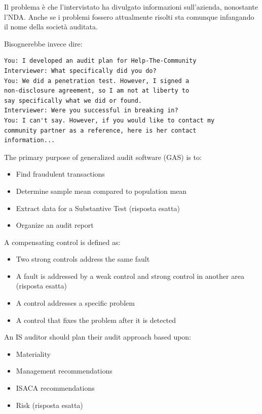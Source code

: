 Il problema è che l'intervistato ha divulgato informazioni sull'azienda,
nonostante l'NDA. Anche se i problemi fossero attualmente risolti sta comunque
infangando il nome della società auditata.


Bisognerebbe invece dire:
\begin{verbatim}
You: I developed an audit plan for Help-The-Community
Interviewer: What specifically did you do?
You: We did a penetration test. However, I signed a
non-disclosure agreement, so I am not at liberty to
say specifically what we did or found.
Interviewer: Were you successful in breaking in?
You: I can't say. However, if you would like to contact my
community partner as a reference, here is her contact
information...
\end{verbatim}




The primary purpose of generalized audit software (GAS) is to:
\begin{itemize}
\item Find fraudulent transactions
\item Determine sample mean compared to population mean
\item Extract data for a Substantive Test (risposta esatta)
\item Organize an audit report
\end{itemize}



A compensating control is defined as:
\begin{itemize}
\item Two strong controls address the same fault
\item A fault is addressed by a weak control and strong control in another area
(risposta esatta)
\item A control addresses a specific problem
\item A control that fixes the problem after it is detected
\end{itemize}



An IS auditor should plan their audit approach based upon:

\begin{itemize}
\item Materiality
\item Management recommendations
\item ISACA recommendations
\item Risk (risposta esatta)
\end{itemize}

